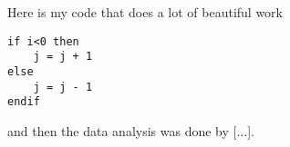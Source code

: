 \documentclass[a4paper]{article}
\begin{document}
Here is my code that does a lot of beautiful work

\begin{verbatim}
if i<0 then
	j = j + 1
else
	j = j - 1
endif
\end{verbatim}

and then the data analysis was done by [...].
\end{document}

